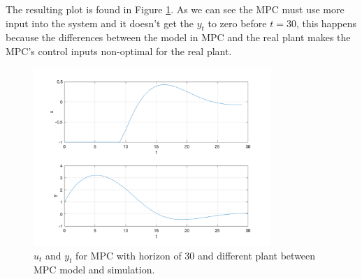 \documentclass[11pt, a4paper, english]{NTNUoving}
\begin{document}
\begin{oppgave}
\begin{punkt}
    The resulting plot is found in Figure \ref{fig:2c}. As we can see the MPC must use more input into the system and it doesn't get the $y_t$ to zero before $t=30$, this
    happens because the differences between the model in MPC and the real plant makes the MPC's control inputs non-optimal for the real plant.
    \begin{figure}[H]
        \centering
        \includegraphics[width=0.8\textwidth]{../2c.png}
        \caption{$u_t$ and $y_t$ for MPC with horizon of 30 and different plant between MPC model and simulation.}
        \label{fig:2c}
    \end{figure}
\end{punkt}
\end{oppgave}
\end{document}

